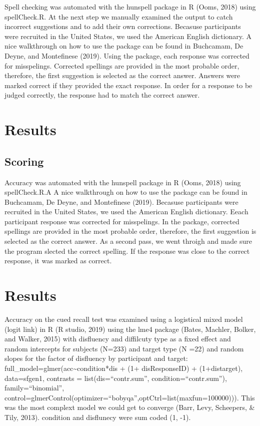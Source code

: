 \documentclass[pdf]{apa6}
\begin{document}
Spell checking was automated with the hunspell package in R (Ooms, 2018) using spellCheck.R. At the next step we manually examined the output to catch incorrect suggestions and to add their own corrections. Becasuse participants were recruited in the United States, we used the American English dictionary. A nice walkthrough on how to use the package can be found in Buchcamam, De Deyne, and Montefinese (2019). Using the package, each response was corrected for misspelings. Corrected spellings are provided in the most probable order, therefore, the first suggestion is selected as the correct answer. Answers were marked correct if they provided the exact response. In order for a response to be judged correctly, the response had to match the correct answer.

\hypertarget{results}{%
\section{Results}\label{results}}

\hypertarget{scoring}{%
\subsection{Scoring}\label{scoring}}

Accuracy was automated with the hunspell package in R (Ooms, 2018) using spellCheck.R.A A nice walkthrough on how to use the package can be found in Buchcamam, De Deyne, and Montefinese (2019). Becasuse participants were recruited in the United States, we used the American English dictionary. Eeach participant response was corrected for misspelings. In the package, corrected spellings are provided in the most probable order, therefore, the first suggestion is selected as the correct answer. As a second pass, we went throigh and made sure the program slected the correct spelling. If the response was close to the correct response, it was marked as correct.

\hypertarget{results-1}{%
\section{Results}\label{results-1}}

Accuracy on the cued recall test was examined using a logistical mixed model (logit link) in R (R studio, 2019) using the lme4 package (Bates, Machler, Bolker, and Walker, 2015) with disfluency and diffilcuty type as a fixed effect and random intercepts for subjects (N=233) and target type (N =22) and random slopes for the factor of disfluency by participant and target: full\_model=glmer(acc\textasciitilde{}condition*dis + (1+ dis\textbar{}ResponseID) + (1+dis\textbar{}target), data=sfgen1, contrasts = list(dis=\enquote{contr.sum}, condition=\enquote{contr.sum}), family=\enquote{binomial}, control=glmerControl(optimizer=\enquote{bobyqa},optCtrl=list(maxfun=100000))). This was the most complext model we could get to converge (Barr, Levy, Scheepers, \& Tily, 2013). condition and disflunecy were sum coded (1, -1).
\end{document}
